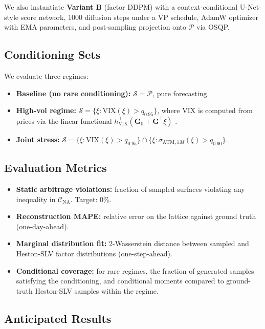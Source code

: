 \documentclass{article}
\newcommand{\1}{\mathbf{1}}
\newcommand{\cP}{\mathcal{P}}
\newcommand{\cC}{\mathcal{C}}
\newcommand{\cS}{\mathcal{S}}
\begin{document}
We also instantiate \textbf{Variant B} (factor DDPM) with a context-conditional U-Net-style score network, 1000 diffusion steps under a VP schedule, AdamW optimizer with EMA parameters, and post-sampling projection onto $\cP$ via OSQP.

\subsection{Conditioning Sets}

We evaluate three regimes:
\begin{itemize}
\item \textbf{Baseline (no rare conditioning):} $\cS = \cP$, pure forecasting.
\item \textbf{High-vol regime:} $\cS = \{\xi : \mathrm{VIX}(\xi) > q_{0.95}\}$, where VIX is computed from prices via the linear functional $h^\top_{\mathrm{VIX}} (\mathbf{G}_0 + \mathbf{G}^\top \xi)$ \citep[\S 4.6]{cohen2021}.
\item \textbf{Joint stress:} $\cS = \{\xi : \mathrm{VIX}(\xi) > q_{0.95}\} \cap \{\xi : \sigma_{\mathrm{ATM},1M}(\xi) > q_{0.90}\}$.
\end{itemize}

\subsection{Evaluation Metrics}

\begin{itemize}
\item \textbf{Static arbitrage violations:} fraction of sampled surfaces violating any inequality in $\cC_{\mathrm{NA}}$. Target: $0\%$.
\item \textbf{Reconstruction MAPE:} relative error on the lattice against ground truth (one-day-ahead). 
\item \textbf{Marginal distribution fit:} 2-Wasserstein distance between sampled and Heston-SLV factor distributions (one-step-ahead).
\item \textbf{Conditional coverage:} for rare regimes, the fraction of generated samples satisfying the conditioning, and conditional moments compared to ground-truth Heston-SLV samples within the regime.
\end{itemize}

\subsection{Anticipated Results}
\end{document}
